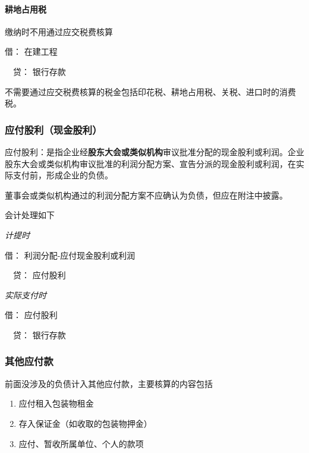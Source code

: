 \documentclass[UTF8,12pt]{ctexart}
\newenvironment{Dr}{\noindent 借：}{\par}
\newenvironment{Cr}{\noindent \ \ 贷：}{\par}
\numberwithin{equation}{section} %
\numberwithin{figure}{section}
\numberwithin{table}{section}
\begin{document}
	\paragraph{耕地占用税}
	缴纳时不用通过应交税费核算
	
	\begin{Dr}
		在建工程
	\end{Dr}
	\begin{Cr}
		银行存款
	\end{Cr}

	不需要通过应交税费核算的税金包括印花税、耕地占用税、关税、进口时的消费税。
	
	\subsubsection{应付股利（现金股利）}
	应付股利：是指企业经\textbf{股东大会或类似机构}审议批准分配的现金股利或利润。企业股东大会或类似机构审议批准的利润分配方案、宣告分派的现金股利或利润，在实际支付前，形成企业的负债。
	
	董事会或类似机构通过的利润分配方案不应确认为负债，但应在附注中披露。
	
	会计处理如下
	
	\textit{计提时}
	
	\begin{Dr}
		利润分配-应付现金股利或利润
	\end{Dr}
	\begin{Cr}
		应付股利
	\end{Cr}

	\textit{实际支付时}
	
	\begin{Dr}
		应付股利
	\end{Dr}
	\begin{Cr}
		银行存款
	\end{Cr}
	
	\subsubsection{其他应付款}
	前面没涉及的负债计入其他应付款，主要核算的内容包括
	\begin{enumerate}
		\item 应付租入包装物租金
		
		\item 存入保证金（如收取的包装物押金）
		
		\item 应付、暂收所属单位、个人的款项
	\end{enumerate}
	
\end{document}
